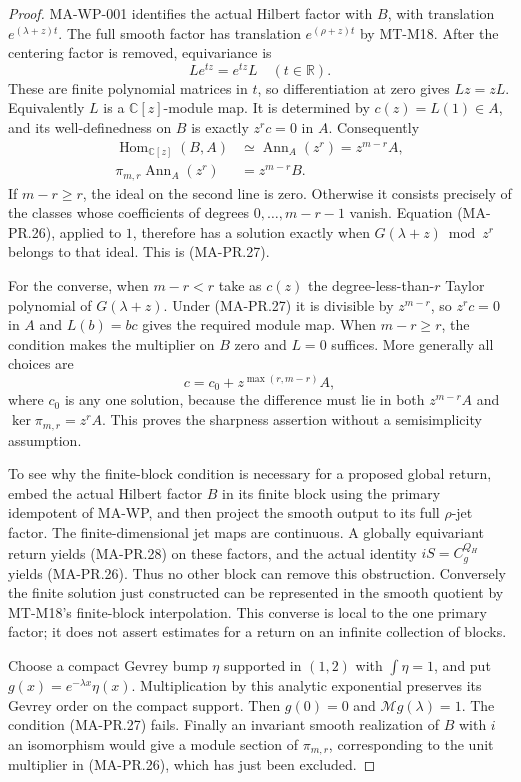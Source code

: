\begin{proof}
MA-WP-001 identifies the actual Hilbert factor with
$B$, with translation $e^{(\lambda+z)t}$.
The full smooth factor has translation
$e^{(\rho+z)t}$ by MT-M18.
After the centering factor is removed, equivariance
is
\[
                      L e^{tz}=e^{tz}L\quad(t\in\mathbb R).
\tag{MA-PR.28}
\]
These are finite polynomial matrices in $t$, so
differentiation at zero gives $Lz=zL$.
Equivalently $L$ is a $\mathbb C[z]$-module map.
It is determined by $c(z)=L(1)\in A$, and its
well-definedness on $B$ is exactly $z^r c=0$ in $A$.
Consequently
\[
\begin{aligned}
 \operatorname{Hom}_{\mathbb C[z]}(B,A)
       &\simeq \operatorname{Ann}_A(z^r)=z^{m-r}A,\\
 \pi_{m,r}\operatorname{Ann}_A(z^r)
       &=z^{m-r}B .
\end{aligned}
\tag{MA-PR.29}
\]
If $m-r\ge r$, the ideal on the second line is zero.
Otherwise it consists precisely of the classes
whose coefficients of degrees $0,\ldots,m-r-1$
vanish.  Equation (MA-PR.26), applied to $1$,
therefore has a solution exactly when
$G(\lambda+z)\bmod z^r$ belongs to that ideal.
This is (MA-PR.27).

For the converse, when $m-r<r$ take as $c(z)$ the
degree-less-than-$r$ Taylor polynomial of
$G(\lambda+z)$.  Under (MA-PR.27) it is divisible
by $z^{m-r}$, so $z^r c=0$ in $A$ and
$L(b)=bc$ gives the required module map.
When $m-r\ge r$, the condition makes the multiplier
on $B$ zero and $L=0$ suffices.
More generally all choices are
\[
              c=c_0+z^{\max(r,m-r)}A,
\tag{MA-PR.30}
\]
where $c_0$ is any one solution, because the difference
must lie in both $z^{m-r}A$ and $\ker\pi_{m,r}=z^r A$.
This proves the sharpness assertion without a
semisimplicity assumption.

To see why the finite-block condition is necessary
for a proposed global return, embed the actual
Hilbert factor $B$ in its finite block using the
primary idempotent of MA-WP, and then project the
smooth output to its full $\rho$-jet factor.
The finite-dimensional jet maps are continuous.
A globally equivariant return yields (MA-PR.28)
on these factors, and the actual identity
$iS=C_g^{Q_H}$ yields (MA-PR.26).
Thus no other block can remove this obstruction.
Conversely the finite solution just constructed
can be represented in the smooth quotient by
MT-M18's finite-block interpolation.  This converse
is local to the one primary factor; it does not
assert estimates for a return on an infinite
collection of blocks.

Choose a compact Gevrey bump $\eta$ supported in
$(1,2)$ with $\int\eta=1$, and put
$g(x)=e^{-\lambda x}\eta(x)$.
Multiplication by this analytic exponential
preserves its Gevrey order on the compact support.
Then $g(0)=0$ and $\mathcal Mg(\lambda)=1$.
The condition (MA-PR.27) fails.
Finally an invariant smooth realization of $B$
with $i$ an isomorphism would give a module section
of $\pi_{m,r}$, corresponding to the unit multiplier
in (MA-PR.26), which has just been excluded.
\end{proof}

